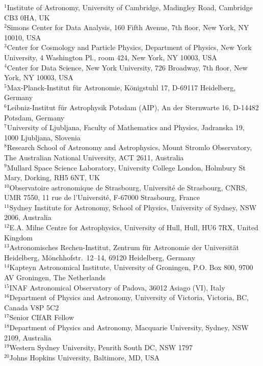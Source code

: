 \documentclass[preprint]{aastex}
\begin{document}
\noindent{}$^{1}${Institute of Astronomy, University of Cambridge, Madingley Road, Cambridge CB3 0HA, UK} \\
$^{2}${Simons Center for Data Analysis, 160 Fifth Avenue, 7th floor, New York, NY 10010, USA} \\
$^{3}${Center for Cosmology and Particle Physics, Department of Physics, New York University, 4 Washington Pl., room 424, New York, NY 10003, USA} \\
$^{4}${Center for Data Science, New York University, 726 Broadway, 7th floor, New York, NY 10003, USA} \\
$^{5}${Max-Planck-Institut f\"ur Astronomie, K\"onigstuhl 17, D-69117 Heidelberg, Germany} \\
$^{6}$Leibniz-Institut für Astrophysik Potsdam (AIP), An der Sternwarte 16, D-14482 Potsdam, Germany \\
$^{7}${University of Ljubljana, Faculty of Mathematics and Physics, Jadranska 19, 1000 Ljubljana, Slovenia} \\
$^{8}${Research School of Astronomy and Astrophysics, Mount Stromlo Observatory, The Australian National University, ACT 2611, Australia} \\
$^{9}${Mullard Space Science Laboratory, University College London, Holmbury St Mary, Dorking, RH5 6NT, UK} \\
$^{10}${Observatoire astronomique de Strasbourg, Universit\'e de Strasbourg, CNRS, UMR 7550, 11 rue de l'Universit\'e, F-67000 Strasbourg, France} \\
$^{11}${Sydney Institute for Astronomy, School of Physics, University of Sydney, NSW 2006, Australia} \\
$^{12}${E.A. Milne Centre for Astrophysics, University of Hull, Hull, HU6 7RX, United Kingdom} \\
$^{13}${Astronomisches Rechen-Institut, Zentrum f\"ur Astronomie der Universit\"at Heidelberg, M\"onchhofstr.\ 12--14, 69120 Heidelberg, Germany} \\
$^{14}${Kapteyn Astronomical Institute, University of Groningen, P.O. Box 800, 9700 AV Groningen, The Netherlands} \\
$^{15}${INAF Astronomical Observatory of Padova, 36012 Asiago (VI), Italy} \\
$^{16}${Department of Physics and Astronomy, University of Victoria, Victoria, BC, Canada V8P 5C2} \\
$^{17}${Senior CIfAR Fellow} \\
$^{18}${Department of Physics and Astronomy, Macquarie University, Sydney, NSW 2109, Australia} \\
$^{19}${Western Sydney University, Penrith South DC, NSW 1797} \\
$^{20}${Johns Hopkins University, Baltimore, MD, USA} \\
\end{document}
